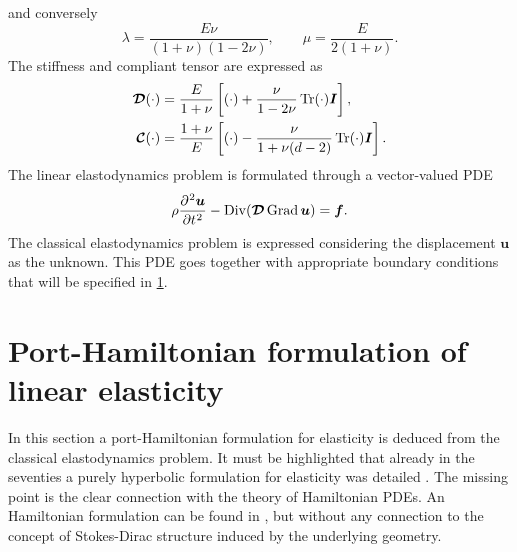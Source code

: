 and conversely
\begin{equation}
\lambda =\frac {E \nu }{(1+\nu )(1-2\nu )}, \qquad
\mu = \frac{E}{2(1+\nu)}.
\end{equation}
The stiffness and compliant tensor are expressed as
\begin{align}
	\bm{\mathcal{D}}(\cdot) &= \frac{E}{1+\nu} \left[(\cdot) + \frac{\nu}{1-2\nu}\Tr(\cdot)\bm{I}\right], \label{eq:stiff3D} \vspace{3pt}\\
	\bm{\mathcal{C}}(\cdot) &= \frac{1+\nu}{E}\left[(\cdot) - \frac{\nu}{1+\nu(d-2)}\Tr(\cdot)\bm{I}\right].
\end{align}
The linear elastodynamics problem is formulated through a vector-valued PDE
\begin{equation}\label{eq:lin_elastodyn}
\rho \diffp[2]{\bm{u}}{t} - \Div(\bm{\mathcal{D}} \Grad \bm{u}) = \bm{f}.
\end{equation}  
The classical elastodynamics problem is expressed considering the displacement $\bm{u}$ as the unknown. This PDE goes together with appropriate boundary conditions that will be specified in \ref{sec:pHelas}.



\section{Port-Hamiltonian formulation of linear elasticity}\label{sec:pHelas}

In this section a port-Hamiltonian formulation for elasticity is deduced from the classical elastodynamics problem. It must be highlighted that already in the seventies a purely hyperbolic formulation for elasticity was detailed \cite{hughes1978classical}. The missing point is the clear connection with the theory of Hamiltonian PDEs. An Hamiltonian formulation can be found in \cite[Chapter 16]{grinfield2015}, but without any connection to the concept of Stokes-Dirac structure induced by the underlying geometry. \\


